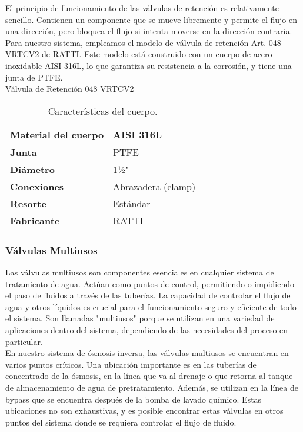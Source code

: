 El principio de funcionamiento de las válvulas de retención es relativamente sencillo. Contienen un componente que se mueve libremente y permite el flujo en una dirección, pero bloquea el flujo si intenta moverse en la dirección contraria.\\

Para nuestro sistema, empleamos el modelo de válvula de retención Art. 048 VRTCV2 de RATTI. Este modelo está construido con un cuerpo de acero inoxidable AISI 316L, lo que garantiza su resistencia a la corrosión, y tiene una junta de PTFE.\\

Válvula de Retención 048 VRTCV2\\

\begin{table}[H]
    \centering
    \caption{Características del cuerpo.}
    \label{table:cuerpo}
    \begin{tabular}{| L{6cm} | L{6cm} |}
        \hline
        \textbf{Material del cuerpo} & AISI 316L \\
        \hline
        \textbf{Junta} & PTFE \\
        \hline
        \textbf{Diámetro} & 1½" \\
        \hline
        \textbf{Conexiones} & Abrazadera (clamp) \\
        \hline
        \textbf{Resorte} & Estándar \\
        \hline
        \textbf{Fabricante} & RATTI \\
        \hline
    \end{tabular}
\end{table}


\subsubsection{Válvulas Multiusos}

Las válvulas multiusos son componentes esenciales en cualquier sistema de tratamiento de agua. Actúan como puntos de control, permitiendo o impidiendo el paso de fluidos a través de las tuberías. La capacidad de controlar el flujo de agua y otros líquidos es crucial para el funcionamiento seguro y eficiente de todo el sistema. Son llamadas "multiusos" porque se utilizan en una variedad de aplicaciones dentro del sistema, dependiendo de las necesidades del proceso en particular.\\

En nuestro sistema de ósmosis inversa, las válvulas multiusos se encuentran en varios puntos críticos. Una ubicación importante es en las tuberías de concentrado de la ósmosis, en la línea que va al drenaje o que retorna al tanque de almacenamiento de agua de pretratamiento. Además, se utilizan en la línea de bypass que se encuentra después de la bomba de lavado químico. Estas ubicaciones no son exhaustivas, y es posible encontrar estas válvulas en otros puntos del sistema donde se requiera controlar el flujo de fluido.\\

